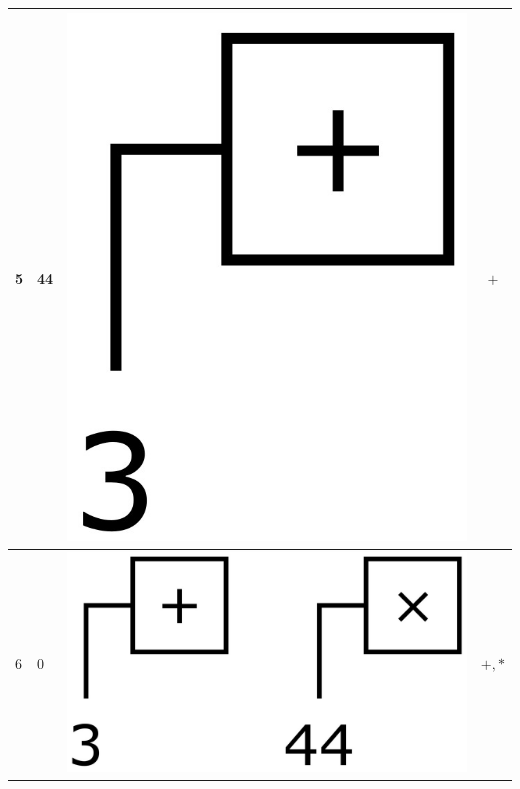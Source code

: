 \documentclass[12pt, a4paper]{report}
\begin{document}
\begin{center}
\begin{tabular}{ |l|l|c|c| }
	5 & 44 & \includegraphics[trim=0 -2 0 -2,height=0.06\textheight]{assets/expr0.jpg} & $+$ \\ 
	\hline
	6 & 0 & \includegraphics[trim=0 -2 0 -2,height=0.06\textheight]{assets/expr1.jpg} & $+, *$ \\ 
	\hline

\end{tabular}
\end{center}
\end{document}
